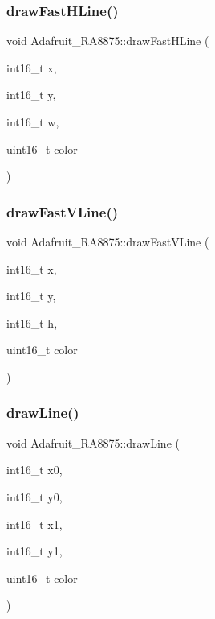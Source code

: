 \subsubsection{\texorpdfstring{drawFastHLine()}{drawFastHLine()}}
{\footnotesize\ttfamily void Adafruit\+\_\+\+R\+A8875\+::draw\+Fast\+H\+Line (\begin{DoxyParamCaption}\item[{int16\+\_\+t}]{x,  }\item[{int16\+\_\+t}]{y,  }\item[{int16\+\_\+t}]{w,  }\item[{uint16\+\_\+t}]{color }\end{DoxyParamCaption})}

\mbox{\label{class_adafruit___r_a8875_a220058cb510ac11f659b002e17cedaac}} 
\subsubsection{\texorpdfstring{drawFastVLine()}{drawFastVLine()}}
{\footnotesize\ttfamily void Adafruit\+\_\+\+R\+A8875\+::draw\+Fast\+V\+Line (\begin{DoxyParamCaption}\item[{int16\+\_\+t}]{x,  }\item[{int16\+\_\+t}]{y,  }\item[{int16\+\_\+t}]{h,  }\item[{uint16\+\_\+t}]{color }\end{DoxyParamCaption})}

\mbox{\label{class_adafruit___r_a8875_a1c5cb990bb00eb69dcd0e32fda9c0452}} 
\subsubsection{\texorpdfstring{drawLine()}{drawLine()}}
{\footnotesize\ttfamily void Adafruit\+\_\+\+R\+A8875\+::draw\+Line (\begin{DoxyParamCaption}\item[{int16\+\_\+t}]{x0,  }\item[{int16\+\_\+t}]{y0,  }\item[{int16\+\_\+t}]{x1,  }\item[{int16\+\_\+t}]{y1,  }\item[{uint16\+\_\+t}]{color }\end{DoxyParamCaption})}

